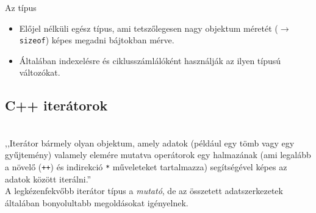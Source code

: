 \begin{frame}
    \begin{exampleblock}{}
        \scriptsize
        
    \end{exampleblock}
\end{frame}

\begin{frame}
    \begin{exampleblock}{}
        \scriptsize
        
    \end{exampleblock}
\end{frame}

\begin{frame}
    Az  típus
    \begin{itemize}
        \item Előjel nélküli egész típus, ami tetszőlegesen nagy objektum méretét ($\to$ \texttt{sizeof}) képes megadni bájtokban mérve.
        \item Általában indexelésre és ciklusszámlálóként használják az ilyen típusú változókat. 
    \end{itemize}
\end{frame}

\subsection{C++ iterátorok}

\begin{frame}
    \begin{description}[m]
        \item[C++ iterátorok] \hfill \\ ,,Iterátor bármely olyan objektum, amely adatok (például egy tömb vagy egy gyűjtemény) valamely elemére mutatva operátorok egy halmazának (ami legalább a növelő (\texttt{++}) és indirekció \texttt{*} műveleteket tartalmazza) segítségével képes az adatok között iterálni.'' \\
        A legkézenfekvőbb iterátor típus a \emph{mutató}, de az összetett adatszerkezetek általában bonyolultabb megoldásokat igényelnek.
    \end{description}
\end{frame}

